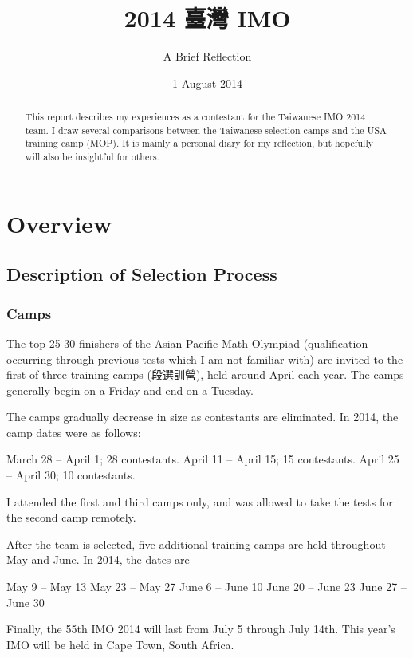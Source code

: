 \documentclass[11pt]{scrreprt}
\begin{document}
\title{2014 臺灣 IMO}
\subtitle{A Brief Reflection}
\date{1 August 2014}
\maketitle

\begin{abstract}
  This report describes my experiences as a contestant for the Taiwanese IMO 2014 team.
  I draw several comparisons between the Taiwanese selection camps and the USA training camp (MOP).
  It is mainly a personal diary for my reflection, but hopefully will also be insightful for others.
\end{abstract}

\tableofcontents

\chapter{Overview}
\section{Description of Selection Process}
\subsection{Camps}
The top 25-30 finishers of the Asian-Pacific Math Olympiad (qualification
occurring through previous tests which I am not familiar with) are invited to
the first of three training camps (段選訓營), held around April each year.
The camps generally begin on a Friday and end on a Tuesday.

The camps gradually decrease in size as contestants are eliminated. In 2014, the camp dates were as follows:
\begin{enumerate}
  \ii March 28 -- April 1; 28 contestants.
  \ii April 11 -- April 15; 15 contestants.
  \ii April 25 -- April 30; 10 contestants.
\end{enumerate}

I attended the first and third camps only, and was allowed to take the tests for the second camp remotely.

After the team is selected, five additional training camps are held throughout May and June.
In 2014, the dates are
\begin{enumerate}
  \ii May 9 -- May 13
  \ii May 23 -- May 27
  \ii June 6 -- June 10
  \ii June 20 -- June 23
  \ii June 27 -- June 30
\end{enumerate}
Finally, the 55th IMO 2014 will last from July 5 through July 14th.
This year's IMO will be held in Cape Town, South Africa.
\end{document}
